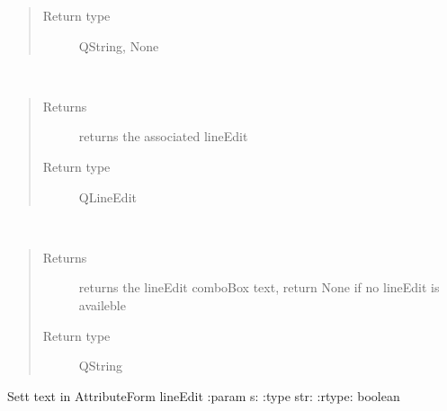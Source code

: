 \documentclass[letterpaper,10pt,english]{sphinxmanual}
\begin{document}
\begin{fulllineitems}
\begin{fulllineitems}
\begin{quote}
\begin{description}
\item[{Return type}] \leavevmode
QString, None

\end{description}\end{quote}

\end{fulllineitems}


\begin{fulllineitems}
\label{\detokenize{code:AttributeForm.AttributeForm.getLineEdit}}~\begin{quote}\begin{description}
\item[{Returns}] \leavevmode
returns the associated lineEdit

\item[{Return type}] \leavevmode
QLineEdit

\end{description}\end{quote}

\end{fulllineitems}


\begin{fulllineitems}
\label{\detokenize{code:AttributeForm.AttributeForm.getLineEditText}}~\begin{quote}\begin{description}
\item[{Returns}] \leavevmode
returns the lineEdit comboBox text, return None if no lineEdit is availeble

\item[{Return type}] \leavevmode
QString

\end{description}\end{quote}

\end{fulllineitems}


\begin{fulllineitems}
\label{\detokenize{code:AttributeForm.AttributeForm.is_number}}
Sett text in AttributeForm lineEdit
:param s:
:type str:
:rtype: boolean


\end{fulllineitems}
\end{fulllineitems}
\end{document}
